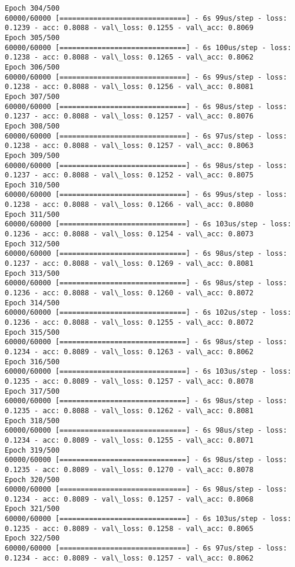 \documentclass[11pt]{article}
\begin{document}
\begin{Verbatim}[commandchars=\\\{\}]
Epoch 304/500
60000/60000 [==============================] - 6s 99us/step - loss: 0.1239 - acc: 0.8088 - val\_loss: 0.1255 - val\_acc: 0.8069
Epoch 305/500
60000/60000 [==============================] - 6s 100us/step - loss: 0.1238 - acc: 0.8088 - val\_loss: 0.1265 - val\_acc: 0.8062
Epoch 306/500
60000/60000 [==============================] - 6s 99us/step - loss: 0.1238 - acc: 0.8088 - val\_loss: 0.1256 - val\_acc: 0.8081
Epoch 307/500
60000/60000 [==============================] - 6s 98us/step - loss: 0.1237 - acc: 0.8088 - val\_loss: 0.1257 - val\_acc: 0.8076
Epoch 308/500
60000/60000 [==============================] - 6s 97us/step - loss: 0.1238 - acc: 0.8088 - val\_loss: 0.1257 - val\_acc: 0.8063
Epoch 309/500
60000/60000 [==============================] - 6s 98us/step - loss: 0.1237 - acc: 0.8088 - val\_loss: 0.1252 - val\_acc: 0.8075
Epoch 310/500
60000/60000 [==============================] - 6s 99us/step - loss: 0.1238 - acc: 0.8088 - val\_loss: 0.1266 - val\_acc: 0.8080
Epoch 311/500
60000/60000 [==============================] - 6s 103us/step - loss: 0.1236 - acc: 0.8088 - val\_loss: 0.1254 - val\_acc: 0.8073
Epoch 312/500
60000/60000 [==============================] - 6s 98us/step - loss: 0.1237 - acc: 0.8088 - val\_loss: 0.1269 - val\_acc: 0.8081
Epoch 313/500
60000/60000 [==============================] - 6s 98us/step - loss: 0.1236 - acc: 0.8088 - val\_loss: 0.1260 - val\_acc: 0.8072
Epoch 314/500
60000/60000 [==============================] - 6s 102us/step - loss: 0.1236 - acc: 0.8088 - val\_loss: 0.1255 - val\_acc: 0.8072
Epoch 315/500
60000/60000 [==============================] - 6s 98us/step - loss: 0.1234 - acc: 0.8089 - val\_loss: 0.1263 - val\_acc: 0.8062
Epoch 316/500
60000/60000 [==============================] - 6s 103us/step - loss: 0.1235 - acc: 0.8089 - val\_loss: 0.1257 - val\_acc: 0.8078
Epoch 317/500
60000/60000 [==============================] - 6s 98us/step - loss: 0.1235 - acc: 0.8088 - val\_loss: 0.1262 - val\_acc: 0.8081
Epoch 318/500
60000/60000 [==============================] - 6s 98us/step - loss: 0.1234 - acc: 0.8089 - val\_loss: 0.1255 - val\_acc: 0.8071
Epoch 319/500
60000/60000 [==============================] - 6s 98us/step - loss: 0.1235 - acc: 0.8089 - val\_loss: 0.1270 - val\_acc: 0.8078
Epoch 320/500
60000/60000 [==============================] - 6s 98us/step - loss: 0.1234 - acc: 0.8089 - val\_loss: 0.1257 - val\_acc: 0.8068
Epoch 321/500
60000/60000 [==============================] - 6s 103us/step - loss: 0.1235 - acc: 0.8089 - val\_loss: 0.1258 - val\_acc: 0.8065
Epoch 322/500
60000/60000 [==============================] - 6s 97us/step - loss: 0.1234 - acc: 0.8089 - val\_loss: 0.1257 - val\_acc: 0.8062

\end{Verbatim}
\end{document}
